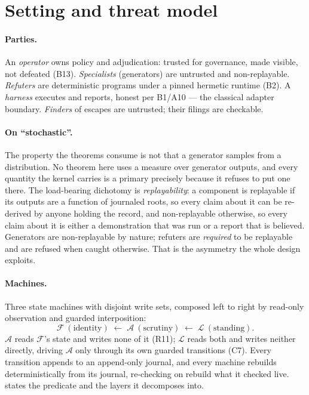 \documentclass[11pt,a4paper]{article}
\theoremstyle{plain}
\theoremstyle{definition}
\theoremstyle{remark}
\begin{document}
\section{Setting and threat model}
\label{sec:setting}

\paragraph{Parties.} An \emph{operator} owns policy and adjudication: trusted for governance, made visible, not defeated (B13). \emph{Specialists} (generators) are untrusted and non-replayable. \emph{Refuters} are deterministic programs under a pinned hermetic runtime (B2). A \emph{harness} executes and reports, honest per B1/A10 --- the classical adapter boundary. \emph{Finders} of escapes are untrusted; their filings are checkable.

\paragraph{On ``stochastic''.} The property the theorems consume is not that a generator samples from a distribution. No theorem here uses a measure over generator outputs, and every quantity the kernel carries is a primary precisely because it refuses to put one there. The load-bearing dichotomy is \emph{replayability}: a component is replayable if its outputs are a function of journaled roots, so every claim about it can be re-derived by anyone holding the record, and non-replayable otherwise, so every claim about it is either a demonstration that was run or a report that is believed. Generators are non-replayable by nature; refuters are \emph{required} to be replayable and are refused when caught otherwise. That is the asymmetry the whole design exploits.

\paragraph{Machines.} Three state machines with disjoint write sets, composed left to right by read-only observation and guarded interposition:
\[
  \mathcal{F}\ (\text{identity}) \;\longleftarrow\; \mathcal{A}\ (\text{scrutiny}) \;\longleftarrow\; \mathcal{L}\ (\text{standing}).
\]
$\mathcal{A}$ reads $\mathcal{F}$'s state and writes none of it (R11); $\mathcal{L}$ reads both and writes neither directly, driving $\mathcal{A}$ only through its own guarded transitions (C7). Every transition appends to an append-only journal, and every machine rebuilds deterministically from its journal, re-checking on rebuild what it checked live.  states the predicate and the layers it decomposes into.
\end{document}
